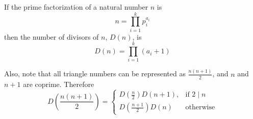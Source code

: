 \documentclass[12pt]{article}
\begin{document}
If the prime factorization of a natural number $n$ is
$$n = \prod_{i=1}^k p_i^{a_i}$$
then the number of divisors of $n$, $D(n)$, is
$$D(n) = \prod_{i=1}^k (a_i+1)$$

Also, note that all triangle numbers can be represented as $\frac{n(n+1)}{2}$, and $n$ and $n+1$ are coprime. Therefore
\[
    D\left(\frac{n(n+1)}{2}\right)= 
\begin{cases}
    D\left(\frac{n}{2}\right)D(n+1),& \text{if } 2 \mid n\\
    D\left(\frac{n+1}{2}\right)D(n) & \text{otherwise}
\end{cases}
\]
\end{document}
